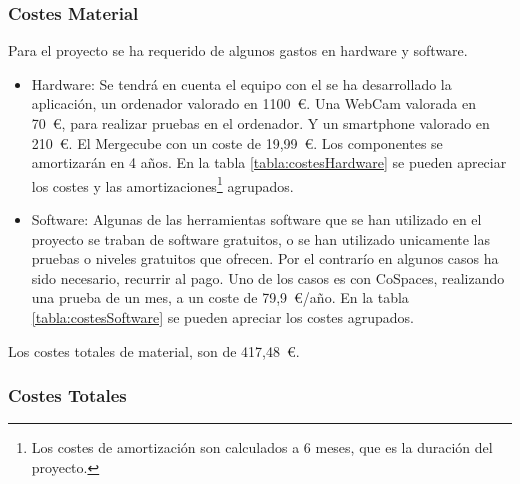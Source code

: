 \subsubsection{Costes Material}
Para el proyecto se ha requerido de algunos gastos en hardware y software.

\begin{itemize}
	\item Hardware:
	Se tendrá en cuenta el equipo con el se ha desarrollado la aplicación, un ordenador valorado en 1100~\euro. Una WebCam valorada en 70~\euro, para realizar pruebas en el ordenador. Y un smartphone valorado en 210~\euro. El Mergecube con un coste de 19,99~\euro. Los componentes se amortizarán en 4 años. En la tabla \ref{tabla:costesHardware} se pueden apreciar los costes  y las amortizaciones\footnote{Los costes de amortización son calculados a 6 meses, que es la duración del proyecto.} agrupados.
	\item Software: Algunas de las herramientas software que se han utilizado en el proyecto se traban de software gratuitos, o se han utilizado unicamente las pruebas o niveles gratuitos que ofrecen. Por el contrarío en algunos casos ha sido necesario, recurrir al pago. Uno de los casos es con CoSpaces, realizando una prueba de un mes, a un coste de 79,9~\euro/año. En la tabla \ref{tabla:costesSoftware} se pueden apreciar los costes agrupados.
\end{itemize}



Los costes totales de material, son de 417,48~\euro.




\subsubsection{Costes Totales}

